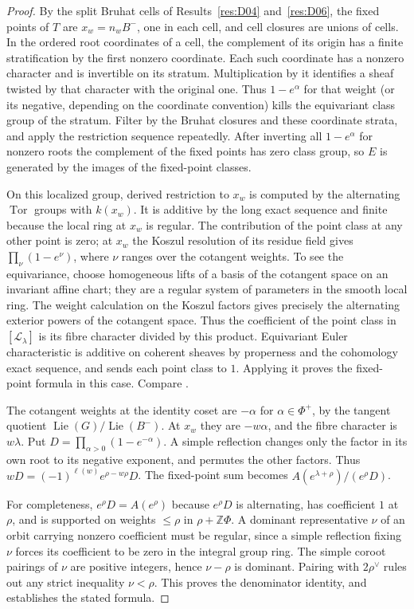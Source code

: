 \documentclass[11pt,a4paper,openany,oneside]{book}
\theoremstyle{resultstyle}
\theoremstyle{definition}
\numberwithin{equation}{chapter}
\DeclareMathOperator{\Lie}{Lie}
\begin{document}
\begin{proof}
By the split Bruhat cells of Results~\ref{res:D04}
and~\ref{res:D06}, the fixed points of \(T\) are
\(x_w=n_w B^-\), one in each cell, and cell closures
are unions of cells. In the ordered root coordinates
of a cell, the complement of its origin has a finite
stratification by the first nonzero coordinate.
Each such coordinate has a nonzero character and is
invertible on its stratum. Multiplication by it identifies
a sheaf twisted by that character with the original one.
Thus \(1-e^\alpha\) for that weight (or its negative,
depending on the coordinate convention) kills the
equivariant class group of the stratum. Filter by the
Bruhat closures and these coordinate strata, and apply
the restriction sequence repeatedly. After inverting
all \(1-e^\alpha\) for nonzero roots the complement of
the fixed points has zero class group, so \(E\) is
generated by the images of the fixed-point classes.

On this localized group, derived restriction to \(x_w\)
is computed by the alternating \(\operatorname{Tor}\)
groups with \(k(x_w)\). It is additive by the long exact
sequence and finite because the local ring at \(x_w\)
is regular. The contribution of the point class at any
other point is zero; at \(x_w\) the Koszul resolution
of its residue field gives
\(\prod_\nu(1-e^\nu)\), where \(\nu\) ranges over the
cotangent weights. To see the equivariance, choose
homogeneous lifts of a basis of the cotangent space
on an invariant affine chart; they are a regular system
of parameters in the smooth local ring. The weight
calculation on the Koszul factors gives precisely the
alternating exterior powers of the cotangent space.
Thus the coefficient of the point class in
\([\mathcal L_\lambda]\) is its fibre character divided
by this product. Equivariant Euler characteristic
is additive on coherent sheaves by properness and the
cohomology exact sequence, and sends each point class
to \(1\). Applying it proves the fixed-point formula
in this case. Compare \cite[Theorem 22.50]{milne}.

The cotangent weights at the identity coset are
\(-\alpha\) for \(\alpha\in\Phi^+\), by the tangent
quotient \(\Lie(G)/\Lie(B^-)\). At \(x_w\) they are
\(-w\alpha\), and the fibre character is \(w\lambda\).
Put \(D=\prod_{\alpha>0}(1-e^{-\alpha})\).
A simple reflection changes only the factor in its own
root to its negative exponent, and permutes the other
factors. Thus \(wD=(-1)^{\ell(w)}e^{\rho-w\rho}D\).
The fixed-point sum becomes \(A(e^{\lambda+\rho})/(e^\rho D)\).

For completeness, \(e^\rho D=A(e^\rho)\) because \(e^\rho D\) is alternating, has coefficient \(1\) at \(\rho\), and is supported on weights \(\leq\rho\) in \(\rho+\mathbb Z\Phi\). A dominant representative \(\nu\) of an orbit carrying nonzero coefficient must be regular, since a simple reflection fixing \(\nu\) forces its coefficient to be zero in the integral group ring. The simple coroot pairings of \(\nu\) are positive integers, hence \(\nu-\rho\) is dominant. Pairing with \(2\rho^\vee\) rules out any strict inequality \(\nu<\rho\). This proves the denominator identity, and establishes the stated formula.


\end{proof}
\end{document}
